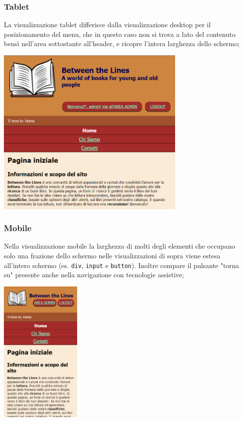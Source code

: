 \documentclass[12pt,a4paper,headings=optiontohead]{article}
\begin{document}
	\subsubsection{Tablet}
	La visualizzazione tablet differisce dalla visualizzazione desktop per il posizionamento del menu, che in questo caso non si trova a lato del contenuto bensì nell'area sottostante all'header, e ricopre l'intera larghezza dello schermo;
	\begin{center}
		\includegraphics[width=0.7\textwidth]{../img/layout_relazione/tablet.png}
	\end{center}
	\subsubsection{Mobile}
	Nella visualizzazione mobile la larghezza di molti degli elementi che occupano solo una frazione dello schermo nelle visualizzazioni di sopra viene estesa all'intero schermo (es. \texttt{div}, \texttt{input} e \texttt{button}). Inoltre compare il pulsante "torna su" presente anche nella navigazione con tecnologie assistive;
	\begin{center}
		\includegraphics[width=0.3\textwidth]{../img/layout_relazione/mobile.png}
	\end{center}
\end{document}
